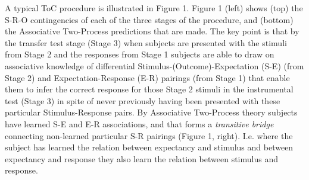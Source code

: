 \documentclass[]{elsarticle} %
\begin{document}
A typical ToC procedure is illustrated in Figure 1. Figure 1 (left)
shows (top) the S-R-O contingencies of each of the three stages of the
procedure, and (bottom) the Associative Two-Process predictions that are
made. The key point is that by the transfer test stage (Stage 3) when
subjects are presented with the stimuli from Stage 2 and the responses
from Stage 1 subjects are able to draw on associative knowledge of
differential Stimulus-(Outcome)-Expectation (S-E) (from Stage 2) and
Expectation-Response (E-R) pairings (from Stage 1) that enable them to
infer the correct response for those Stage 2 stimuli in the instrumental
test (Stage 3) in spite of never previously having been presented with
these particular Stimulus-Response pairs. By Associative Two-Process
theory subjects have learned S-E and E-R associations, and that forms a
\emph{transitive bridge} connecting non-learned particular S-R pairings
(Figure 1, right). I.e. where the subject has learned the relation
between expectancy and stimulus and between expectancy and response they
also learn the relation between stimulus and response.
\end{document}
